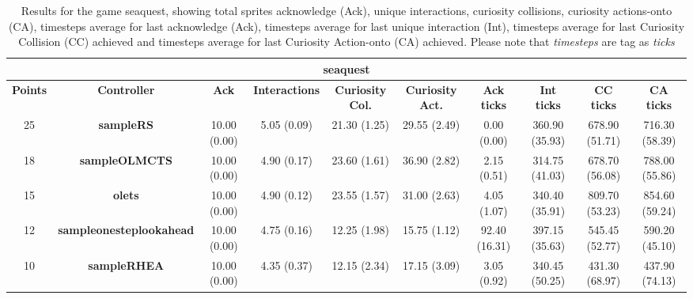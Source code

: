 \begin{table*}[!t]
\begin{center}
\begin{adjustbox}{width=1\textwidth}
\begin{tabular}{|c|c|c|c|c|c|c|c|c|c|}
\multicolumn{10}{c}{\textbf{seaquest}}\\
\hline
\textbf{Points} & \textbf{Controller} & \textbf{Ack} & \textbf{Interactions} & \textbf{Curiosity Col.} & \textbf{Curiosity Act.} & \textbf{Ack ticks} & \textbf{Int ticks} & \textbf{CC ticks} & \textbf{CA ticks}\\
\hline
25 & \textbf{sampleRS} & 10.00 (0.00) & 5.05 (0.09) & 21.30 (1.25) & 29.55 (2.49) & 0.00 (0.00) & 360.90 (35.93) & 678.90 (51.71) & 716.30 (58.39)
 \\
\hline
18 & \textbf{sampleOLMCTS} & 10.00 (0.00) & 4.90 (0.17) & 23.60 (1.61) & 36.90 (2.82) & 2.15 (0.51) & 314.75 (41.03) & 678.70 (56.08) & 788.00 (55.86)
 \\
\hline
15 & \textbf{olets} & 10.00 (0.00) & 4.90 (0.12) & 23.55 (1.57) & 31.00 (2.63) & 4.05 (1.07) & 340.40 (35.91) & 809.70 (53.23) & 854.60 (59.24)
 \\
\hline
12 & \textbf{sampleonesteplookahead} & 10.00 (0.00) & 4.75 (0.16) & 12.25 (1.98) & 15.75 (1.12) & 92.40 (16.31) & 397.15 (35.63) & 545.45 (52.77) & 590.20 (45.10)
 \\
\hline
10 & \textbf{sampleRHEA} & 10.00 (0.00) & 4.35 (0.37) & 12.15 (2.34) & 17.15 (3.09) & 3.05 (0.92) & 340.45 (50.25) & 431.30 (68.97) & 437.90 (74.13)
 \\
\hline
\end{tabular}
\end{adjustbox}
\caption{Results for the game seaquest, showing total sprites acknowledge (Ack), unique interactions, curiosity collisions, curiosity actions-onto (CA), timesteps average for last acknowledge (Ack),  timesteps average for last unique interaction (Int), timesteps average for last Curiosity Collision (CC) achieved and timesteps average for last Curiosity Action-onto (CA) achieved. Please note that \textit{timesteps} are tag as \textit{ticks}}
\label{tab:weights}
\end{center}
\end{table*}
